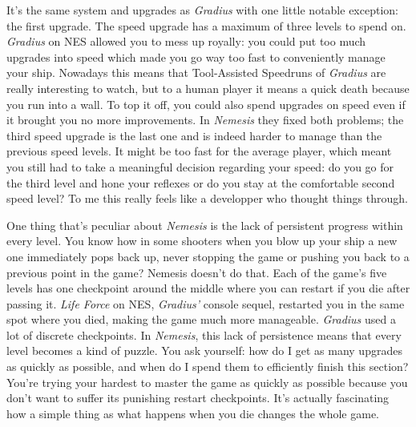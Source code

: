 \documentclass{book}
\let\oldcenter\center
\let\oldendcenter\endcenter
\renewenvironment{center}{\setlength\topsep{0pt}\oldcenter}{\oldendcenter}
\begin{document}
It’s the same system and upgrades as \emph{Gradius} with one little notable exception: the first upgrade. The speed upgrade has a maximum of three levels to spend on. \emph{Gradius} on NES allowed you to mess up royally: you could put too much upgrades into speed which made you go way too fast to conveniently manage your ship. Nowadays this means that Tool-Assisted Speedruns of \emph{Gradius} are really interesting to watch, but to a human player it means a quick death because you run into a wall. To top it off, you could also spend upgrades on speed even if it brought you no more improvements. In \emph{Nemesis} they fixed both problems; the third speed upgrade is the last one and is indeed harder to manage than the previous speed levels. It might be too fast for the average player, which meant you still had to take a meaningful decision regarding your speed: do you go for the third level and hone your reflexes or do you stay at the comfortable second speed level? To me this really feels like a developper who thought things through.

\begin{center}
\vspace{8pt}
\quad\vspace{4pt}
\end{center}

One thing that’s peculiar about \emph{Nemesis} is the lack of persistent progress within every level. You know how in some shooters when you blow up your ship a new one immediately pops back up, never stopping the game or pushing you back to a previous point in the game? Nemesis doesn’t do that. Each of the game’s five levels has one checkpoint around the middle where you can restart if you die after passing it. \emph{Life Force} on NES, \emph{Gradius’} console sequel, restarted you in the same spot where you died, making the game much more manageable. \emph{Gradius} used a lot of discrete checkpoints. In \emph{Nemesis}, this lack of persistence means that every level becomes a kind of puzzle. You ask yourself: how do I get as many upgrades as quickly as possible, and when do I spend them to efficiently finish this section? You’re trying your hardest to master the game as quickly as possible because you don’t want to suffer its punishing restart checkpoints. It’s actually fascinating how a simple thing as what happens when you die changes the whole game.
\end{document}
